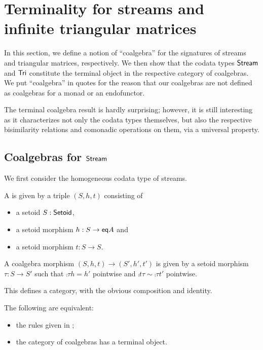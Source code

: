 \documentclass[envcountsame]{llncs}
\begin{document}
\section{Terminality for streams and infinite triangular matrices}\label{sec:coalgebras_for_tri}

In this section, we define a notion of \enquote{coalgebra} for the signatures of streams and triangular matrices,
respectively. We then show that the codata types $\mathsf{Stream}$ and $\mathsf{Tri}$ constitute the terminal object in
the respective category of coalgebras.
We put \enquote{coalgebra} in quotes for the reason that our coalgebras are not defined as coalgebras for a monad or an endofunctor.

The terminal coalgebra result is hardly surprising; however, it is still interesting as it characterizes not only the codata types themselves,
 but also the respective bisimilarity relations and comonadic operations on them, via a universal property.
 


\begin{Long}
\subsection{Coalgebras for $\mathsf{Stream}$}

We first consider the homogeneous codata type of streams.
\end{Long}

\begin{definition}%
 \label{cat_stream}
  A  is given by a triple $(S,h,t)$ 
  consisting of
  \begin{itemize}
   \item a setoid $S : \mathsf{Setoid}$,
   \item a setoid morphism $h : S \to \mathsf{eq} A$ and
   \item a setoid morphism $t : S \to S$.
  \end{itemize}
  A coalgebra morphism $(S,h,t) \to (S',h',t')$ is given by a setoid morphism $\tau : S \to S'$ such that
     $\comp{\tau}{h} = h'$ pointwise and
     $ \comp{t}{\tau} \sim \comp{\tau}{t'}$ pointwise.
\end{definition}

This defines a category, with the obvious composition and identity. 

\begin{theorem}\label{thm_stream_terminal}
 The following are equivalent:
 \begin{itemize}
  \item the rules given in ;
  \item the category of coalgebras has a terminal object.
 \end{itemize}
\end{theorem}
\end{document}
